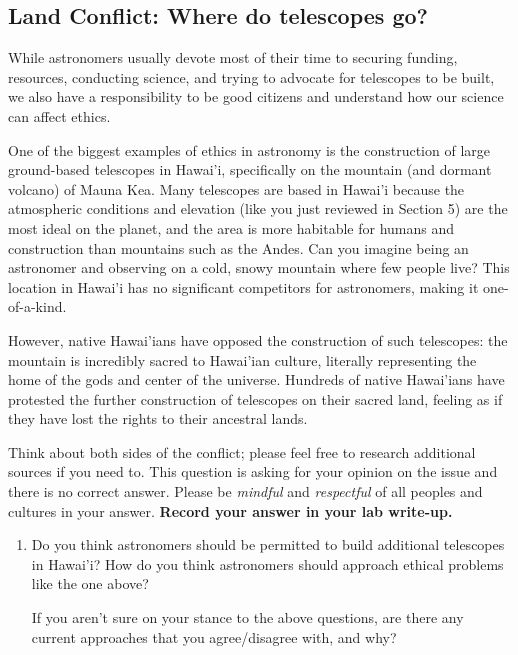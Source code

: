 \documentclass[11pt]{article}
\begin{document}
\subsection{Land Conflict: Where do telescopes go?}

While astronomers usually devote most of their time to securing funding, resources, conducting science, and trying to advocate for telescopes to be built, we also have a responsibility to be good citizens and understand how our science can affect ethics.

One of the biggest examples of ethics in astronomy is the construction of large ground-based telescopes in Hawai'i, specifically on the mountain (and dormant volcano) of Mauna Kea. Many telescopes are based in Hawai'i because the atmospheric conditions and elevation (like you just reviewed in Section 5) are the most ideal on the planet, and the area is more habitable for humans and construction than mountains such as the Andes. Can you imagine being an astronomer and observing on a cold, snowy mountain where few people live? This location in Hawai'i has no significant competitors for astronomers, making it one-of-a-kind. 

However, native Hawai'ians have opposed the construction of such telescopes: the mountain is incredibly sacred to Hawai'ian culture, literally representing the home of the gods and center of the universe. Hundreds of native Hawai'ians have protested the further construction of telescopes on their sacred land, feeling as if they have lost the rights to their ancestral lands.

Think about both sides of the conflict; please feel free to research additional sources if you need to. This question is asking for your opinion on the issue and there is no correct answer. Please be \emph{mindful} and \emph{respectful} of all peoples and cultures in your answer. \textbf{Record your answer in your lab write-up.}

\begin{enumerate} 
    \item Do you think astronomers should be permitted to build additional telescopes in Hawai'i? How do you think astronomers should approach ethical problems like the one above? 
    
    If you aren't sure on your stance to the above questions, are there any current approaches that you agree/disagree with, and why?
\end{enumerate}

\end{document}
